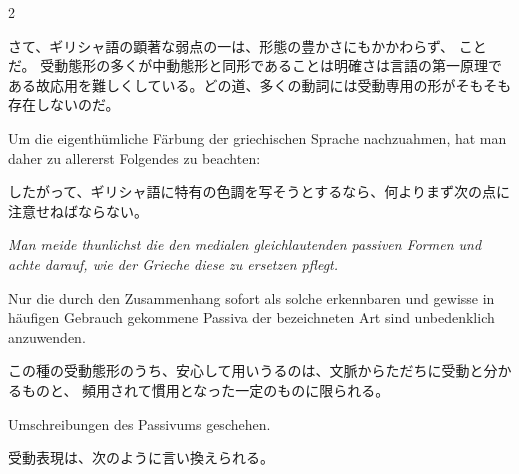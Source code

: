\begin{paracol}{2}
\begin{enumerate}[leftmargin=0pt,rightmargin=0pt,listparindent =1cm,labelindent=1cm,labelsep=1ex,labelwidth={*},itemindent={*},align=left]
\begin{japanese}
さて、ギリシャ語の顕著な弱点の一は、形態の豊かさにもかかわらず、
ことだ。
受動態形の多くが中動態形と同形であることは\—{}明確さは言語の第一原理である故\—{}応用を難しくしている。どの道、多くの動詞には受動専用の形がそもそも存在しないのだ。
\end{japanese}
\switchcolumn*

\begin{german}
Um die eigenthümliche Färbung der griechischen Sprache nachzuahmen,
hat man daher zu allererst Folgendes zu beachten:
\end{german}
\switchcolumn

\begin{japanese}
したがって、ギリシャ語に特有の色調を写そうとするなら、何よりまず次の点に注意せねばならない。
\end{japanese}
\switchcolumn*

\begin{german}
\emph{Man meide thunlichst die den medialen gleichlautenden passiven
Formen und achte darauf, wie der Grieche diese zu ersetzen pflegt.}
\end{german}
\switchcolumn

\begin{japanese}
\end{japanese}
\switchcolumn*

\begin{german}
Nur die durch den Zusammenhang sofort als solche erkennbaren und
gewisse in häufigen Gebrauch gekommene Passiva der bezeichneten Art
sind unbedenklich anzuwenden.
\end{german}
\switchcolumn

\begin{japanese}
この種の受動態形のうち、安心して用いうるのは、文脈からただちに受動と分かるものと、
頻用されて慣用となった一定のものに限られる。
\end{japanese}
\switchcolumn*

\begin{german}
Umschreibungen des Passivums geschehen.
\end{german}
\switchcolumn

\begin{japanese}
受動表現は、次のように言い換えられる。
\end{japanese}
\switchcolumn*


\end{enumerate}
\end{paracol}
